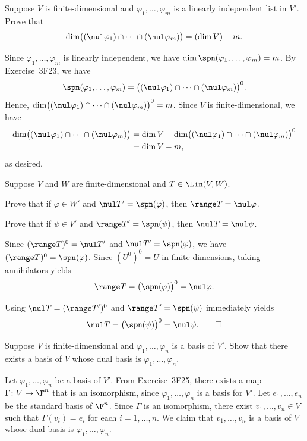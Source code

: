 \begin{exc}
\begin{exercise}
Suppose $V$ is finite-dimensional and $\varphi_1,\dots,\varphi_m$ is a linearly
independent list in $V'$. Prove that
\[ \dim\bigl((\nul\varphi_1)\cap\cdots\cap(\nul\varphi_m)\bigr)
   = (\dim V)-m. \]
\end{exercise}
\begin{solution}
Since $\varphi_1,\dots,\varphi_m$ is linearly independent, we have
$\dim\spn(\varphi_1,\allowbreak\dots,\varphi_m)=m$. By Exercise~3F23, we have
\[ \spn(\varphi_1,\dots,\varphi_m)
   = \bigl((\nul\varphi_1)\cap\cdots\cap(\nul\varphi_m)\bigr)^0. \]
Hence, $\dim\bigl((\nul\varphi_1)\cap\cdots\cap(\nul\varphi_m)\bigr)^0=m$.
Since $V$ is finite-dimensional, we have
\begin{align*}
\dim\bigl((\nul\varphi_1)\cap\cdots\cap(\nul\varphi_m)\bigr)
 &= \dim V-\dim\bigl((\nul\varphi_1)\cap\cdots\cap(\nul\varphi_m)\bigr)^0\\
 &= \dim V-m,
\end{align*}
as desired.
\end{solution}

\begin{exercise}
Suppose $V$ and $W$ are finite-dimensional and $T\in\Lin(V,W)$.
\begin{parts}
\item Prove that if $\varphi\in W'$ and $\nul T'=\spn(\varphi)$, then
  $\range T=\nul\varphi$.
\item Prove that if $\psi\in V'$ and $\range T'=\spn(\psi)$, then
  $\nul T=\nul\psi$.
\end{parts}
\end{exercise}
\begin{solution}\leavevmode
\begin{parts}
\item Since $(\range T)^0=\nul T'$ and $\nul T'=\spn(\varphi)$, we have
  $(\range T)^0=\spn(\varphi)$. Since $(U^0)^0=U$ in finite dimensions, taking
  annihilators yields
  \[ \range T = \bigl(\spn(\varphi)\bigr)^0 = \nul\varphi. \]
\item Using $\nul T=(\range T')^0$ and $\range T'=\spn(\psi)$ immediately
  yields
  \[ \nul T = \bigl(\spn(\psi)\bigr)^0 = \nul\psi. \qedhere \]
\end{parts}
\end{solution}

\begin{exercise}
Suppose $V$ is finite-dimensional and $\varphi_1,\dots,\varphi_n$ is a basis of
$V'$. Show that there exists a basis of $V$ whose dual basis is
$\varphi_1,\dots,\varphi_n$.
\end{exercise}
\begin{solution}
Let $\varphi_1,\dots,\varphi_n$ be a basis of $V'$. From Exercise~3F25, there
exists a map $\Gamma\colon V\to\F^n$ that is an isomorphism, since
$\varphi_1,\dots,\varphi_n$ is a basis for $V'$. Let $e_1,\dots,e_n$ be the
standard basis of $\F^n$. Since $\Gamma$ is an isomorphism, there exist
$v_1,\dots,v_n\in V$ such that $\Gamma(v_i)=e_i$ for each $i=1,\dots,n$. We
claim that $v_1,\dots,v_n$ is a basis of $V$ whose dual basis is
$\varphi_1,\dots,\varphi_n$.


\end{solution}
\end{exc}
